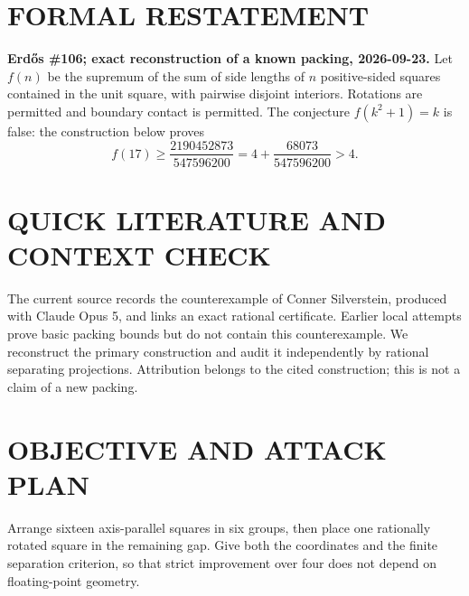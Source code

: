 \section{FORMAL RESTATEMENT}
\textbf{Erd\H{o}s \#106; exact reconstruction of a known packing, 2026-09-23.}
Let $f(n)$ be the supremum of the sum of side lengths of $n$ positive-sided squares contained in the unit square, with pairwise disjoint interiors. Rotations are permitted and boundary contact is permitted. The conjecture $f(k^2+1)=k$ is false: the construction below proves
\[
f(17)\geq\frac{2190452873}{547596200}
=4+\frac{68073}{547596200}>4.
\tag{1}
\]

\section{QUICK LITERATURE AND CONTEXT CHECK}
The current source records the counterexample of Conner Silverstein, produced with Claude Opus 5, and links an exact rational certificate. Earlier local attempts prove basic packing bounds but do not contain this counterexample. We reconstruct the primary construction and audit it independently by rational separating projections. Attribution belongs to the cited construction; this is not a claim of a new packing.

\section{OBJECTIVE AND ATTACK PLAN}
Arrange sixteen axis-parallel squares in six groups, then place one rationally rotated square in the remaining gap. Give both the coordinates and the finite separation criterion, so that strict improvement over four does not depend on floating-point geometry.

